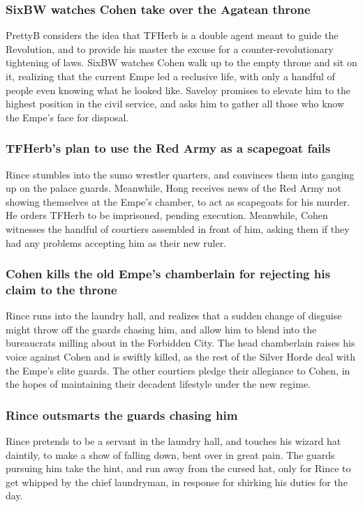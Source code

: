 \subsubsection{\Gls{SixBW} watches \Gls{Cohen} take over the Agatean throne}
\Gls{PrettyB} considers the idea that \Gls{TFHerb} is a double agent meant to guide the Revolution,
and to provide his master the excuse for a counter-revolutionary tightening of laws. \Gls{SixBW}
watches \Gls{Cohen} walk up to the empty throne and sit on it, realizing that the current \Gls{Empe}
led a reclusive life, with only a handful of people even knowing what he looked like. \Gls{Saveloy}
promises to elevate him to the highest position in the civil service, and asks him to gather all
those who know the \Gls{Empe}'s face for disposal.

\subsubsection{\Gls{TFHerb}'s plan to use the Red Army as a scapegoat fails}
\Gls{Rince} stumbles into the sumo wrestler quarters, and convinces them into ganging up on the
palace guards. Meanwhile, \Gls{Hong} receives news of the Red Army not showing themselves at the
\Gls{Empe}'s chamber, to act as scapegoats for his murder. He orders \Gls{TFHerb} to be imprisoned,
pending execution. Meanwhile, \Gls{Cohen} witnesses the handful of courtiers assembled in front of
him, asking them if they had any problems accepting him as their new ruler.

\subsubsection{\Gls{Cohen} kills the old \Gls{Empe}'s chamberlain for rejecting his claim to the
    throne}
\Gls{Rince} runs into the laundry hall, and realizes that a sudden change of disguise might throw
off the guards chasing him, and allow him to blend into the bureaucrats milling about in the
Forbidden City. The head chamberlain raises his voice against \Gls{Cohen} and is swiftly killed,
as the rest of the Silver Horde deal with the \Gls{Empe}'s elite guards. The other courtiers pledge
their allegiance to \Gls{Cohen}, in the hopes of maintaining their decadent lifestyle under the new
regime.

\subsubsection{\Gls{Rince} outsmarts the guards chasing him}
\Gls{Rince} pretends to be a servant in the laundry hall, and touches his wizard hat daintily, to
make a show of falling down, bent over in great pain. The guards pursuing him take the hint, and
run away from the cursed hat, only for \Gls{Rince} to get whipped by the chief laundryman, in
response for shirking his duties for the day.

